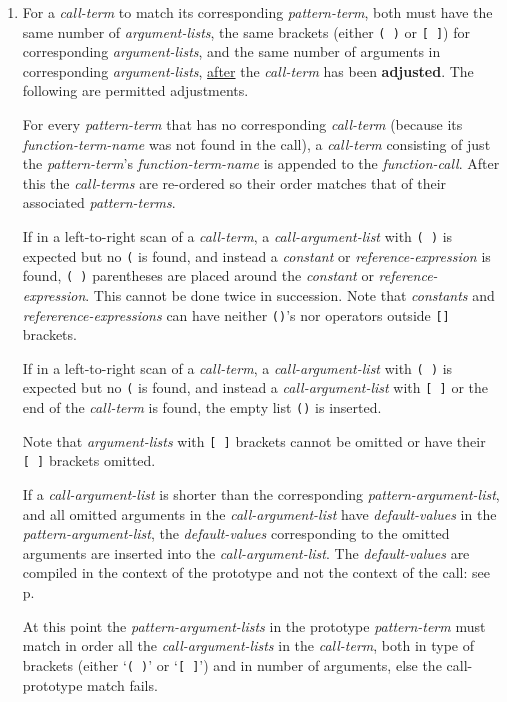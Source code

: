 \documentclass[12pt]{article}
\newcommand{\key}[1]{{\rm \bfseries #1}}
\newcommand{\pagref}[1]{p\pageref{#1}}
\begin{document}
\begin{enumerate}
\item For a {\em call-term} to match its corresponding {\em pattern-term},
both must have the same number of {\em argument-lists}, the same
brackets (either {\tt (~)} or {\tt [~]}) for corresponding
{\em argument-lists}, and the same number of
arguments in corresponding {\em argument-lists}, \underline{after}
the {\em call-term} has been \key{adjusted}.  The following are
permitted adjustments.

For every {\em pattern-term} that has no corresponding {\em call-term}
(because its {\em function-term-name} was not found in the call),
a {\em call-term} consisting of just the {\em pattern-term}'s
{\em function-term-name} is appended to the {\em function-call}.
After this the {\em call-terms} are re-ordered so their order
matches that of their associated {\em pattern-terms}.

If in a left-to-right scan of a {\em call-term},
a {\em call-argument-list} with {\tt (~)} is expected but no {\tt (}
is found, and instead a {\em constant} or {\em reference-expression}
is found, {\tt (~)} parentheses are placed around the
{\em constant} or {\em reference-expression}.  This cannot be
done twice in succession.  Note that {\em constants} and
{\em refererence-expressions} can have neither {\tt ()}'s nor operators
outside {\tt []} brackets.

If in a left-to-right scan of a {\em call-term},
a {\em call-argument-list} with {\tt (~)} is expected but no {\tt (}
is found, and instead a {\em call-argument-list} with {\tt [~]}
or the end of the {\em call-term} is found,
the empty list {\tt ()} is inserted.

Note that {\em argument-lists} with {\tt [~]} brackets cannot
be omitted or have their {\tt [~]} brackets omitted.

If a {\em call-argument-list} is shorter than the
corresponding {\em pattern-argument-list}, and all omitted
arguments in the {\em call-argument-list} have {\em default-values}
in the {\em pattern-argument-list}, the {\em default-values} corresponding
to the omitted arguments are inserted into
the {\em call-argument-list}.
The {\em default-values} are compiled in the context of the prototype
and not the context of the call: see \pagref{DEFAULT-CONTEXT}.

At this point the {\em pattern-argument-lists} in the prototype
{\em pattern-term} must match in order all the {\em call-argument-lists}
in the {\em call-term}, both in
type of brackets (either `{\tt (~)}' or `{\tt [~]}') and in number
of arguments, else the call-prototype match fails.


\end{enumerate}
\end{document}

